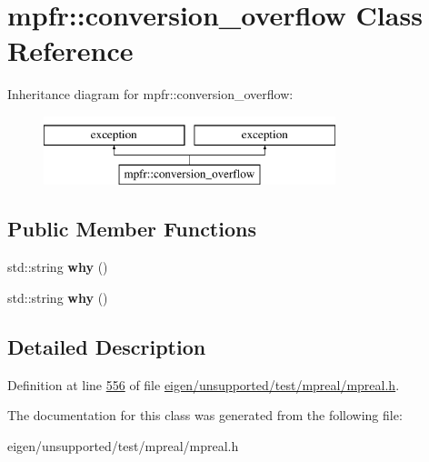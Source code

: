 \hypertarget{classmpfr_1_1conversion__overflow}{}\section{mpfr\+:\+:conversion\+\_\+overflow Class Reference}
\label{classmpfr_1_1conversion__overflow}
Inheritance diagram for mpfr\+:\+:conversion\+\_\+overflow\+:\begin{figure}[H]
\begin{center}
\leavevmode
\includegraphics[height=2.000000cm]{classmpfr_1_1conversion__overflow}
\end{center}
\end{figure}
\subsection*{Public Member Functions}
\begin{DoxyCompactItemize}
\item 
\mbox{\label{classmpfr_1_1conversion__overflow_a211e5d93a1d81c73a3cd57c080b60356}} 
std\+::string {\bfseries why} ()
\item 
\mbox{\label{classmpfr_1_1conversion__overflow_a211e5d93a1d81c73a3cd57c080b60356}} 
std\+::string {\bfseries why} ()
\end{DoxyCompactItemize}


\subsection{Detailed Description}


Definition at line \hyperlink{eigen_2unsupported_2test_2mpreal_2mpreal_8h_source_l00556}{556} of file \hyperlink{eigen_2unsupported_2test_2mpreal_2mpreal_8h_source}{eigen/unsupported/test/mpreal/mpreal.\+h}.



The documentation for this class was generated from the following file\+:\begin{DoxyCompactItemize}
\item 
eigen/unsupported/test/mpreal/mpreal.\+h\end{DoxyCompactItemize}

